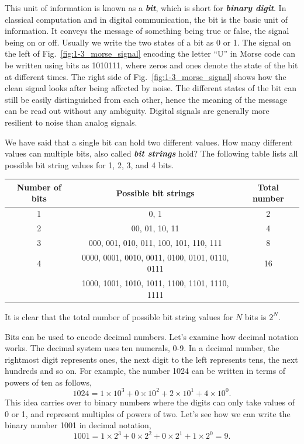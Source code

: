 This unit of information is known as a \textit{\textbf{bit}}, which is short for \textit{\textbf{binary digit}}.
In classical computation and in digital communication, the bit is the basic unit of information.
It conveys the message of something being true or false, the signal being on or off.
Usually we write the two states of a bit as 0 or 1.
The signal on the left of Fig.~\ref{fig:1-3_morse_signal} encoding the letter ``U'' in Morse code can be written using bits as 1010111, where zeros and ones denote the state of the bit at different times.
The right side of Fig.~\ref{fig:1-3_morse_signal} shows how the clean signal looks after being affected by noise.
The different states of the bit can still be easily distinguished from each other, hence the meaning of the message can be read out without any ambiguity.
Digital signals are generally more resilient to noise than analog signals.

We have said that a single bit can hold two different values.
How many different values can multiple bits, also called \textit{\textbf{bit strings}} hold?
The following table lists all possible bit string values for 1, 2, 3, and 4 bits.
\begin{table}[ht]
    \centering
    \begin{tabular}{c|c|c}
        Number of bits  & Possible bit strings & Total number \\
        \hline
        1 & 0, 1 & 2 \\
        2 & 00, 01, 10, 11 & 4 \\
        3 & 000, 001, 010, 011, 100, 101, 110, 111 & 8 \\
        4 & 0000, 0001, 0010, 0011, 0100, 0101, 0110, 0111 & 16 \\
        & 1000, 1001, 1010, 1011, 1100, 1101, 1110, 1111 & 
    \end{tabular}
\end{table}
It is clear that the total number of possible bit string values for $N$ bits is $2^N$.

Bits can be used to encode decimal numbers.
Let's examine how decimal notation works.
The decimal system uses ten numerals, 0-9.
In a decimal number, the rightmost digit represents ones, the next digit to the left represents tens, the next hundreds and so on.
For example, the number 1024 can be written in terms of powers of ten as follows,
\begin{equation}
    1024 = 1 \times 10^3 + 0 \times 10^2 + 2 \times 10^1 + 4 \times 10^0.
\end{equation}
This idea carries over to binary numbers where the digits can only take values of 0 or 1, and represent multiples of powers of two.
Let's see how we can write the binary number 1001 in decimal notation,
\begin{equation}
    1001 = 1 \times 2^3 + 0 \times 2^2 + 0 \times 2^1 + 1 \times 2^0 = 9.
\end{equation}

